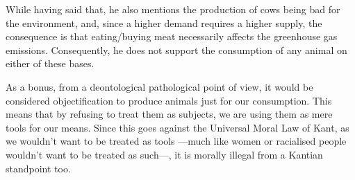 \documentclass{myassignment}
\begin{document}
\begin{answer}
		While having said that, he also mentions the production of cows being bad for the environment, and, since a higher demand requires a higher supply, the consequence is that eating/buying meat necessarily affects the greenhouse gas emissions. Consequently, he does not support the consumption of any animal on either of these bases.

		As a bonus, from a deontological pathological point of view, it would be considered objectification to produce animals just for our consumption. This means that by refusing to treat them as subjects, we are using them as mere tools for our means. Since this goes against the Universal Moral Law of Kant, as we wouldn't want to be treated as tools ---much like women or racialised people wouldn't want to be treated as such---, it is morally illegal from a Kantian standpoint too.
 	\end{answer}
\end{document}
